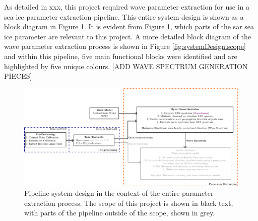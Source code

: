 As detailed in xxx, this project required wave parameter extraction for use in a sea ice parameter extraction pipeline. This entire system design is shown as a block diagram in Figure \ref{fig:systemDesign.wholeProject}. It is evident from Figure \ref{fig:systemDesign.wholeProject}, which parts of the \acs{sar} sea ice parameter are relevant to this project. A more detailed block diagram of the wave parameter extraction process is shown in Figure \ref{fig:systemDesign.scope} and within this pipeline, five main functional blocks were identified and are highlighted by five unique colours. [ADD WAVE SPECTRUM GENERATION PIECES]
\begin{figure}[H]
    \centering
    \includegraphics[width=.95\linewidth]{Figures/PipelineDesign/overall_project.pdf}
    \caption{Pipeline system design in the context of the entire parameter extraction process. The scope of this project is shown in black text, with parts of the pipeline outside of the scope, shown in grey.}
    \label{fig:systemDesign.wholeProject}
\end{figure}

